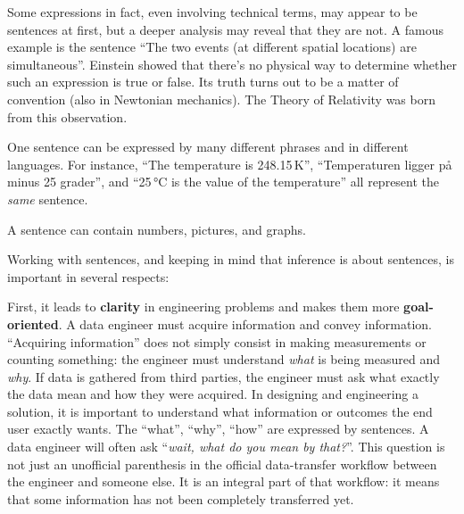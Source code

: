 \documentclass[
  a4paper,
  DIV=11,
  numbers=noendperiod,
  oneside]{scrreprt}
\begin{document}
Some expressions in fact, even involving technical terms, may appear to
be sentences at first, but a deeper analysis may reveal that they are
not. A famous example is the sentence ``{The two events (at different
spatial locations) are simultaneous}''. Einstein showed that there's no
physical way to determine whether such an expression is true or false.
Its truth turns out to be a matter of convention (also in Newtonian
mechanics). The Theory of Relativity was born from this observation.


One sentence can be expressed by many different phrases and in different
languages. For instance, ``{The temperature is 248.15\,K}'',
``{Temperaturen ligger på minus 25 grader}'', and ``{25\,°C is the value
of the temperature}'' all represent the \emph{same} sentence.

A sentence can contain numbers, pictures, and graphs.

Working with sentences, and keeping in mind that inference is about
sentences, is important in several respects:

First, it leads to \textbf{clarity} in engineering problems and makes
them more \textbf{goal-oriented}. A data engineer must acquire
information and convey information. ``Acquiring information'' does not
simply consist in making measurements or counting something: the
engineer must understand \emph{what} is being measured and \emph{why}.
If data is gathered from third parties, the engineer must ask what
exactly the data mean and how they were acquired. In designing and
engineering a solution, it is important to understand what information
or outcomes the end user exactly wants. The ``what'', ``why'', ``how''
are expressed by sentences. A data engineer will often ask ``\emph{wait,
what do you mean by that?}''. This question is not just an unofficial
parenthesis in the official data-transfer workflow between the engineer
and someone else. It is an integral part of that workflow: it means that
some information has not been completely transferred yet.
\end{document}
